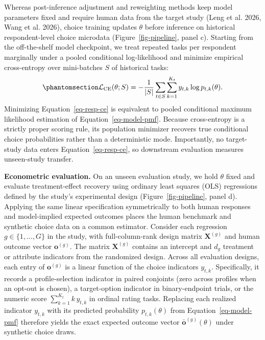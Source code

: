 \documentclass[
  11pt,
  letterpaper,
]{article}
\begin{document}
Whereas post-inference adjustment and reweighting methods keep model
parameters fixed and require human data from the target study (Leng et
al. 2026, Wang et al. 2026), choice training updates \(\theta\) before
inference on historical respondent-level choice microdata
(Figure~\ref{fig-pipeline}, panel c). Starting from the off-the-shelf
model checkpoint, we treat repeated tasks per respondent marginally
under a pooled conditional log-likelihood and minimize empirical
cross-entropy over mini-batches \(S\) of historical tasks:
\begin{equation}\protect\phantomsection\label{eq-resp-ce}{
\mathcal{L}_{\mathrm{CE}}(\theta; S) = -\frac{1}{|S|} \sum_{t \in S} \sum_{k=1}^{K_t} y_{t,k} \log p_{t,k}(\theta).
}\end{equation} Minimizing Equation~\ref{eq-resp-ce} is equivalent to
pooled conditional maximum likelihood estimation of
Equation~\ref{eq-model-pmf}. Because cross-entropy is a strictly proper
scoring rule, its population minimizer recovers true conditional choice
probabilities rather than a deterministic mode. Importantly, no
target-study data enters Equation~\ref{eq-resp-ce}, so downstream
evaluation measures unseen-study transfer.

\textbf{Econometric evaluation.} On an unseen evaluation study, we hold
\(\theta\) fixed and evaluate treatment-effect recovery using ordinary
least squares (OLS) regressions defined by the study's experimental
design (Figure~\ref{fig-pipeline}, panel d). Applying the same linear
specification symmetrically to both human responses and model-implied
expected outcomes places the human benchmark and synthetic choice data
on a common estimator. Consider each regression
\(g \in \{1, \dots, G\}\) in the study, with full-column-rank design
matrix \(\mathbf{X}^{(g)}\) and human outcome vector
\(\mathbf{o}^{(g)}\). The matrix \(\mathbf{X}^{(g)}\) contains an
intercept and \(d_g\) treatment or attribute indicators from the
randomized design. Across all evaluation designs, each entry of
\(\mathbf{o}^{(g)}\) is a linear function of the choice indicators
\(y_{t,k}\). Specifically, it records a profile-selection indicator in
paired conjoints (zero across profiles when an opt-out is chosen), a
target-option indicator in binary-endpoint trials, or the numeric score
\(\sum_{k=1}^{K_t} k\,y_{t,k}\) in ordinal rating tasks. Replacing each
realized indicator \(y_{t,k}\) with its predicted probability
\(p_{t,k}(\theta)\) from Equation~\ref{eq-model-pmf} therefore yields
the exact expected outcome vector \(\bar{\mathbf{o}}^{(g)}(\theta)\)
under synthetic choice draws.
\end{document}

